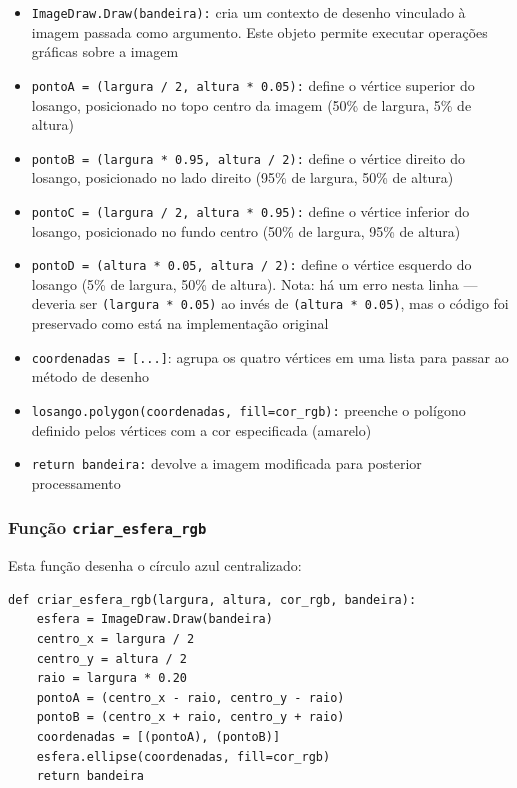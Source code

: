 \documentclass{article}
\begin{document}
\begin{itemize}
    \item \texttt{ImageDraw.Draw(bandeira):} cria um contexto de desenho vinculado à imagem passada como argumento. Este objeto permite executar operações gráficas sobre a imagem

    \item \texttt{pontoA = (largura / 2, altura * 0.05):} define o vértice superior do losango, posicionado no topo centro da imagem (50\% de largura, 5\% de altura)

    \item \texttt{pontoB = (largura * 0.95, altura / 2):} define o vértice direito do losango, posicionado no lado direito (95\% de largura, 50\% de altura)

    \item \texttt{pontoC = (largura / 2, altura * 0.95):} define o vértice inferior do losango, posicionado no fundo centro (50\% de largura, 95\% de altura)

    \item \texttt{pontoD = (altura * 0.05, altura / 2):} define o vértice esquerdo do losango (5\% de largura, 50\% de altura). Nota: há um erro nesta linha — deveria ser \texttt{(largura * 0.05)} ao invés de \texttt{(altura * 0.05)}, mas o código foi preservado como está na implementação original

    \item \texttt{coordenadas = [...]}: agrupa os quatro vértices em uma lista para passar ao método de desenho

    \item \texttt{losango.polygon(coordenadas, fill=cor\_rgb):} preenche o polígono definido pelos vértices com a cor especificada (amarelo)

    \item \texttt{return bandeira:} devolve a imagem modificada para posterior processamento
\end{itemize}

\subsubsection{Função \texttt{criar\_esfera\_rgb}}

Esta função desenha o círculo azul centralizado:

\begin{lstlisting}[style=pythonstyle]
def criar_esfera_rgb(largura, altura, cor_rgb, bandeira):
    esfera = ImageDraw.Draw(bandeira)
    centro_x = largura / 2
    centro_y = altura / 2
    raio = largura * 0.20
    pontoA = (centro_x - raio, centro_y - raio)
    pontoB = (centro_x + raio, centro_y + raio)
    coordenadas = [(pontoA), (pontoB)]
    esfera.ellipse(coordenadas, fill=cor_rgb)
    return bandeira
\end{lstlisting}
\end{document}
